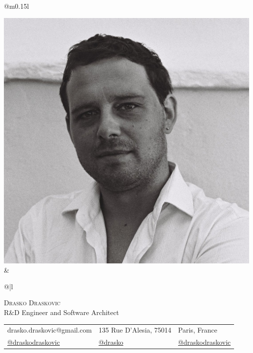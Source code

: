 \documentclass[8pt, a4paper, oneside, final]{scrartcl}
\begin{document}
  \begin{tabular}{@{}m{0.15\linewidth}l}

    \includegraphics[width=\linewidth]{ja-mali.jpg} &

    \renewcommand{\arraystretch}{2.5}
    \begin{tabular}{@{}|l}

      \textsc{\huge{Drasko Draskovic}} \\
      \large{R\&D Engineer and Software Architect} \\

      \renewcommand{\arraystretch}{1}
      \begin{tabular}{@{}lll}
        \small{\faAt} drasko.draskovic@gmail.com &
        \small{\faEnvelopeO} 135 Rue D'Alesia, 75014 &
        \small{\faMapMarker} Paris, France \\
        \small{\faLinkedin} \href{https://www.linkedin.com/in/draskodraskovic}{@draskodraskovic} &
        \small{\faGithub} \href{https://github.com/drasko}{@drasko} &
        \small{\faTwitter} \href{https://twitter.com/draskodraskovic}{@draskodraskovic}
      \end{tabular}

    \end{tabular}

  \end{tabular}
\end{document}
